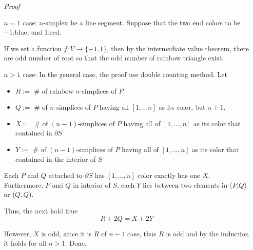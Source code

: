 \documentclass[a4paper,12pt]{article}
\begin{document}
\textit{Proof} 

$n=1$ case: $n$-simplex be a line segment.
Suppose that the two end colors to be $-1$:blue, and $1$:red. 

\begin{center}
\end{center}

If we set a function $f:V \rightarrow \{-1, 1\}$, then 
by the intermediate value theorem, there are odd number of root
so that the odd number of rainbow triangle exist.

$n>1$ case: In the general case, the proof use double counting method.
Let 

\begin{itemize}
    \item $R :=$ \# of rainbow $n$-simplices of $P$.
    \item $Q :=$ \# of $n$-simplices of $P$ having all $[1, \dots n]$ as its color, but $n+1$.
    \item $X :=$ \# of $(n-1)$-simplices of $P$ having all of $[1, \dots, n]$ as its color that contained in $\partial S$
    \item $Y :=$ \# of $(n-1)$-simplices of $P$ having all of $[1, \dots, n]$ as its color that contained in the interior of $S$
\end{itemize}

Each $P$ and $Q$ attached to $\partial S$ has $[1, \dots, n]$ color exactly 
has one $X$. Furthermore, $P$ and $Q$ in interior of $S$, each $Y$ lies between two elements in ($P$,$Q$) or ($Q, Q$).

Thus, the next hold true
\begin{equation}
    R+2Q = X + 2Y
\end{equation}

However, $X$ is odd, since it is $R$ of $n-1$ case, thus $R$ is odd and by the induction it holds for all $n>1$. Done.
\end{document}
